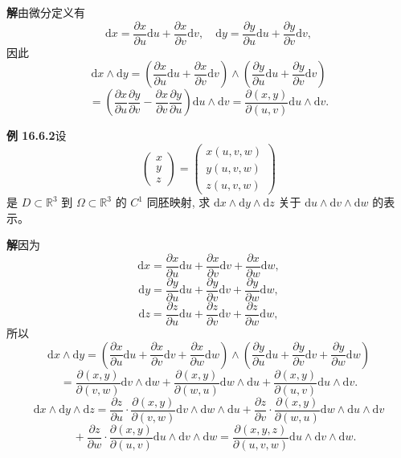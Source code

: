 \documentclass[UTF8, 12pt, fontset=fandol, oneside]{ctexart}
\begin{document}
\noindent\textbf{解}\quad 由微分定义有
\[
  \mathrm dx=\frac{\partial x}{\partial u}\mathrm du+\frac{\partial x}{\partial v}\mathrm dv,
  \quad
  \mathrm dy=\frac{\partial y}{\partial u}\mathrm du+\frac{\partial y}{\partial v}\mathrm dv,
\]
因此
\[
  \mathrm dx\wedge\mathrm dy
  =\left(\frac{\partial x}{\partial u}\mathrm du+\frac{\partial x}{\partial v}\mathrm dv\right)
  \wedge
  \left(\frac{\partial y}{\partial u}\mathrm du+\frac{\partial y}{\partial v}\mathrm dv\right)
\]
\[
  =\left(\frac{\partial x}{\partial u}\frac{\partial y}{\partial v}
  -\frac{\partial x}{\partial v}\frac{\partial y}{\partial u}\right)\mathrm du\wedge\mathrm dv
  =\frac{\partial(x,y)}{\partial(u,v)}\mathrm du\wedge\mathrm dv.
\]

\noindent\textbf{例 16.6.2}\quad 设
\[
  \begin{pmatrix}x\\y\\z\end{pmatrix}
  =
  \begin{pmatrix}x(u,v,w)\\y(u,v,w)\\z(u,v,w)\end{pmatrix}
\]
是 $D\subset\mathbb R^3$ 到 $\Omega\subset\mathbb R^3$ 的 $C^1$ 同胚映射, 求 $\mathrm dx\wedge\mathrm dy\wedge\mathrm dz$ 关于 $\mathrm du\wedge\mathrm dv\wedge\mathrm dw$ 的表示。

\noindent\textbf{解}\quad 因为
\[
  \mathrm dx=\frac{\partial x}{\partial u}\mathrm du+\frac{\partial x}{\partial v}\mathrm dv+\frac{\partial x}{\partial w}\mathrm dw,
\]
\[
  \mathrm dy=\frac{\partial y}{\partial u}\mathrm du+\frac{\partial y}{\partial v}\mathrm dv+\frac{\partial y}{\partial w}\mathrm dw,
\]
\[
  \mathrm dz=\frac{\partial z}{\partial u}\mathrm du+\frac{\partial z}{\partial v}\mathrm dv+\frac{\partial z}{\partial w}\mathrm dw,
\]
所以
\[
  \mathrm dx\wedge\mathrm dy
  =\left(\frac{\partial x}{\partial u}\mathrm du+\frac{\partial x}{\partial v}\mathrm dv+\frac{\partial x}{\partial w}\mathrm dw\right)
  \wedge
  \left(\frac{\partial y}{\partial u}\mathrm du+\frac{\partial y}{\partial v}\mathrm dv+\frac{\partial y}{\partial w}\mathrm dw\right)
\]
\[
  =\frac{\partial(x,y)}{\partial(v,w)}\mathrm dv\wedge\mathrm dw
  +\frac{\partial(x,y)}{\partial(w,u)}\mathrm dw\wedge\mathrm du
  +\frac{\partial(x,y)}{\partial(u,v)}\mathrm du\wedge\mathrm dv.
\]
\[
  \mathrm dx\wedge\mathrm dy\wedge\mathrm dz
  =\frac{\partial z}{\partial u}\cdot\frac{\partial(x,y)}{\partial(v,w)}
  \mathrm dv\wedge\mathrm dw\wedge\mathrm du
  +\frac{\partial z}{\partial v}\cdot\frac{\partial(x,y)}{\partial(w,u)}
  \mathrm dw\wedge\mathrm du\wedge\mathrm dv
\]
\[
  \quad+\frac{\partial z}{\partial w}\cdot\frac{\partial(x,y)}{\partial(u,v)}
  \mathrm du\wedge\mathrm dv\wedge\mathrm dw
  =\frac{\partial(x,y,z)}{\partial(u,v,w)}\mathrm du\wedge\mathrm dv\wedge\mathrm dw.
\]
\end{document}
